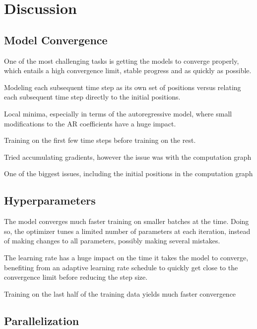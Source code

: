 \chapter{Discussion}\label{ch:Discussion}

\section{Model Convergence}

One of the most challenging tasks is getting the models to converge properly, which entails a high convergence limit, stable progress and as quickly as possible.

Modeling each subsequent time step as its own set of positions versus relating each subsequent time step directly to the initial positions.

Local minima, especially in terms of the autoregressive model, where small modifications to the AR coefficients have a huge impact.


Training on the first few time steps before training on the rest.


Tried accumulating gradients, however the issue was with the computation graph

One of the biggest issues, including the initial positions in the computation graph


\section{Hyperparameters}

The model converges much faster training on smaller batches at the time. Doing so, the optimizer tunes a limited number of parameters at each iteration, instead of making changes to all parameters, possibly making several mistakes.

The learning rate has a huge impact on the time it takes the model to converge, benefiting from an adaptive learning rate schedule to quickly get close to the convergence limit before reducing the step size.



Training on the last half of the training data yields much faster convergence

\section{Parallelization}